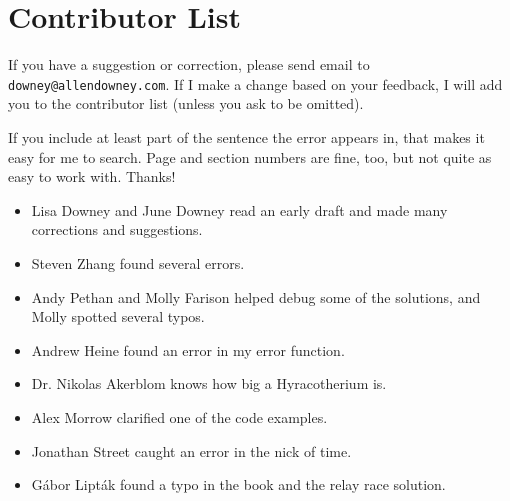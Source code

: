 \documentclass[12pt]{book}
\begin{document}



\section*{Contributor List}

If you have a suggestion or correction, please send email to 
{\tt downey@allendowney.com}.  If I make a change based on your
feedback, I will add you to the contributor list
(unless you ask to be omitted).

If you include at least part of the sentence the
error appears in, that makes it easy for me to search.  Page and
section numbers are fine, too, but not quite as easy to work with.
Thanks!

\small

\begin{itemize}

\item Lisa Downey and June Downey read an early draft and made many
corrections and suggestions.

\item Steven Zhang found several errors.

\item Andy Pethan and Molly Farison helped debug some of the solutions,
and Molly spotted several typos.

\item Andrew Heine found an error in my error function.

\item Dr. Nikolas Akerblom knows how big a Hyracotherium is.

\item Alex Morrow clarified one of the code examples.

\item Jonathan Street caught an error in the nick of time.

\item G\'{a}bor Lipt\'{a}k found a typo in the book and the relay race solution.


\end{itemize}

\normalsize

\clearemptydoublepage
\end{document}
